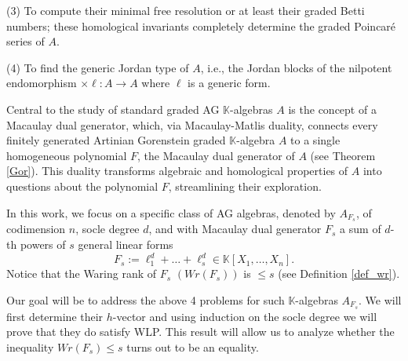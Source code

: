 \documentclass[12pt,twoside]{amsart}
\numberwithin{equation}{section} \hyphenation{semi-stable}
\newcommand{\K}{\mathbb{K}}
\theoremstyle{definition}
\begin{document}
(3) To compute their minimal free resolution or at least their graded Betti numbers; these homological invariants completely determine the graded Poincaré series of $A$. 

(4) To find the generic Jordan type of $A$, i.e., the Jordan blocks of the nilpotent endomorphism $\times \ell: A\longrightarrow A$ where $\ell $ is a generic form.


\vskip 2mm

Central to the study of standard graded AG $\K$-algebras $A$ is
the concept of a Macaulay dual generator, which, via Macaulay-Matlis duality, connects every finitely
generated Artinian Gorenstein graded $\K$-algebra $A$ to a single homogeneous polynomial $F$, the Macaulay dual generator of $A$ (see Theorem \ref{Gor}). This
duality  transforms algebraic and homological  properties
of $A$ into questions about the polynomial $F$, streamlining their exploration.



In this work, we focus on a specific class of AG algebras, denoted by $A_{F_s}$,  of codimension $n$, socle degree $d$, and with Macaulay dual generator $F_s$  a sum of $d$-th powers of $s$ general linear forms 
$$F_s := \ell_1^d + \dots + \ell_s^d \in \mathbb{K}[X_1, \ldots, X_n].$$
Notice that the Waring rank of $F_s$ $(Wr(F_s))$ is $\le s$ (see Definition \ref{def_wr}).


Our goal will be to address the above 4 problems for such $\K$-algebras $A_{F_s}$. We will first determine their $h$-vector and using induction on the socle degree we will  prove that they do satisfy WLP. This result will allow us to analyze whether the inequality $Wr(F_s)\le s$ turns out to be an equality.
\end{document}
